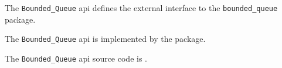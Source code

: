 
The {\tt Bounded\_Queue} api defines the external interface to the {\tt bounded\_queue} package.

The {\tt Bounded\_Queue} api is implemented by the  package.

The {\tt Bounded\_Queue} api source code is .
